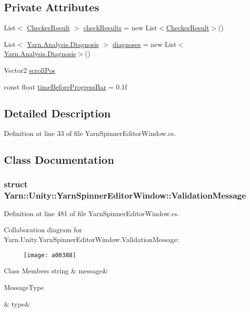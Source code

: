 \subsection*{Private Attributes}
\begin{DoxyCompactItemize}
\item 
List$<$ \hyperlink{a00051}{Checker\-Result} $>$ \hyperlink{a00188_aa85ab7bd194e5425b991b9c216d4d10e}{check\-Results} = new List$<$\hyperlink{a00051}{Checker\-Result}$>$()
\item 
List$<$ \hyperlink{a00093}{Yarn.\-Analysis.\-Diagnosis} $>$ \hyperlink{a00188_a25c92cbfdd09661a96714d05b14af886}{diagnoses} = new List$<$\hyperlink{a00093}{Yarn.\-Analysis.\-Diagnosis}$>$()
\item 
Vector2 \hyperlink{a00188_a2d9b9702b0980af9d4202aebd440124b}{scroll\-Pos}
\item 
const float \hyperlink{a00188_a62a14b3fbaf2da41154ebad0eb7b6d3f}{time\-Before\-Progress\-Bar} = 0.\-1f
\end{DoxyCompactItemize}


\subsection{Detailed Description}


Definition at line 33 of file Yarn\-Spinner\-Editor\-Window.\-cs.



\subsection{Class Documentation}
\label{a00386}
\hypertarget{a00188_a00386}{}
\subsubsection{struct Yarn\-:\-:Unity\-:\-:Yarn\-Spinner\-Editor\-Window\-:\-:Validation\-Message}


Definition at line 481 of file Yarn\-Spinner\-Editor\-Window.\-cs.



Collaboration diagram for Yarn.\-Unity.\-Yarn\-Spinner\-Editor\-Window.\-Validation\-Message\-:
\nopagebreak
\begin{figure}[H]
\begin{center}
\leavevmode
\texttt{[image: a00388]}
\end{center}
\end{figure}
\begin{DoxyFields}{Class Members}
\hypertarget{a00188_a636dce6708e779c201fa5e7d01cf2955}{string}\label{a00188_a636dce6708e779c201fa5e7d01cf2955}
&
message&
\\
\hline

\hypertarget{a00188_a7d342190c7657fbbe85eb6fa66bcabb8}{Message\-Type}\label{a00188_a7d342190c7657fbbe85eb6fa66bcabb8}
&
type&
\\
\hline

\end{DoxyFields}


